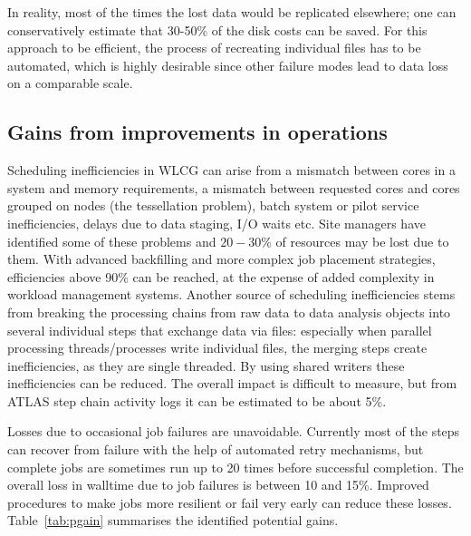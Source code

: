 In reality, most of the times the lost data would be replicated
elsewhere; one can conservatively estimate that 30-50\% of the disk
costs can be saved. For this approach to be efficient, the process of
recreating individual files has to be automated, which is highly
desirable since other failure modes lead to data loss on a comparable
scale.

\subsection{Gains from improvements in operations}
Scheduling inefficiencies in WLCG can arise from a mismatch between
cores in a system and memory requirements, a mismatch between
requested cores and cores grouped on nodes (the tessellation problem),
batch system or pilot service inefficiencies, delays due to data
staging, I/O waits etc. Site managers have identified some of these
problems and $20-30\%$ of resources may be lost due to them. With
advanced backfilling and more complex job placement strategies,
efficiencies above 90\% can be reached, at the expense of added
complexity in workload management systems. Another source of
scheduling inefficiencies stems from breaking the processing chains
from raw data to data analysis objects into several individual steps
that exchange data via files: especially when parallel processing
threads/processes write individual files, the merging steps create
inefficiencies, as they are single threaded. By using shared writers
these inefficiencies can be reduced. The overall impact is difficult
to measure, but from ATLAS step chain activity logs it can be
estimated to be about 5\%.

Losses due to occasional job failures are unavoidable. Currently most
of the steps can recover from failure with the help of automated retry
mechanisms, but complete jobs are sometimes run up to 20 times before
successful completion. The overall loss in walltime due to job
failures is between 10 and 15\%. Improved procedures to make jobs more
resilient or fail very early can reduce these losses.
Table~\ref{tab:pgain} summarises the identified potential gains.

